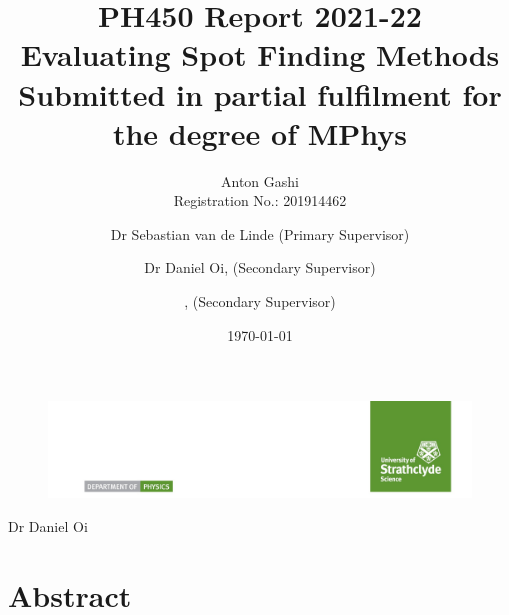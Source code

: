 \documentclass[aps,pra,a4paper,nofootinbib,onecolumn,tightenlines,longbibliography,12pt,amsfonts,amssymb,amsmath,floatfix]{revtex4-2} %
\newcommand{\projecttitle}{Evaluating Spot Finding Methods}%
\newcommand{\studentname}{Anton Gashi}%
\newcommand{\regnumber}{201914462}
\newcommand{\degree}{MPhys}
\newcommand{\primarysup}{Dr Sebastian van de Linde}
\newcommand{\secondsup}{Dr Daniel Oi}%
\begin{document}

\begin{figure}
\includegraphics[width=\textwidth]{ScienceLogo.png}
\end{figure}

\title{PH450 Report 2021-22\\ \vspace{1cm}
{\huge \projecttitle}\\[0.5cm] %
{\footnotesize Submitted in partial fulfilment for the degree of \degree}}

\author{\studentname\\
Registration No.: \regnumber}

\author{\primarysup{} (Primary Supervisor)}
\noaffiliation
\ifdefined\secondsup %
\author{\secondsup, (Secondary Supervisor)} %
\noaffiliation
\fi
\ifdefined\thirdsup
\author{\thirdsup, (Secondary Supervisor)} %
\noaffiliation
\fi

\date{\today}


\maketitle

\newpage %


\section*{Abstract} %
\end{document}
